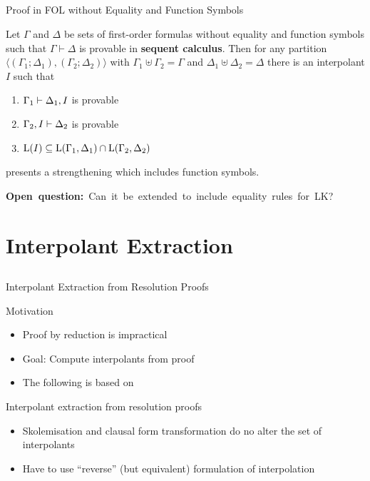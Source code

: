 \documentclass[final,compress]{beamer}
\begin{document}
\subsection{}
\begin{frame}{Proof in FOL without Equality and Function Symbols}


	\begin{lemma}[Maehara]
		Let $\Gamma$ and $\Delta$ be sets of first-order formulas without equality and function symbols such that $\Gamma \vdash \Delta$ is provable in \textbf{sequent calculus}.
		Then for any partition $\langle(\Gamma_1;\Delta_1),(\Gamma_2;\Delta_2)\rangle$ with
		$\Gamma_1 \uplus \Gamma_2 = \Gamma$ and $\Delta_1 \uplus \Delta_2 = \Delta$
		there is an interpolant $I$ such that
		\begin{enumerate}
			\item $\Gamma_1 \vdash \Delta_1, I$ is provable
			\item $\Gamma_2, I \vdash \Delta_2$ is provable
			\item $\operatorname{L}(I) \subseteq \operatorname{L}(\Gamma_1, \Delta_1) \cap \operatorname{L}(\Gamma_2, \Delta_2)$
		\end{enumerate}
	\end{lemma}

	\pause
	\cite{baaz2011methods} presents a strengthening which includes function symbols.

	\mbox{\textbf{Open question:} Can it be extended to include equality rules for LK?}
\end{frame}

\section{Interpolant Extraction} 

\subsection{}
\begin{frame}{Interpolant Extraction from Resolution Proofs}
	\begin{block}{Motivation}
		\begin{itemize}
			\item Proof by reduction is impractical
			\item Goal: Compute interpolants from proof
			\item The following is based on \cite{Huang95}
		\end{itemize}
	\end{block}
	\pause
	\begin{block}{Interpolant extraction from resolution proofs}
		\begin{itemize}
			\item Skolemisation and clausal form transformation do no alter the set of interpolants
			\item Have to use ``reverse'' (but equivalent) formulation of interpolation
		\end{itemize}
	\end{block}
\end{frame}
\end{document}
